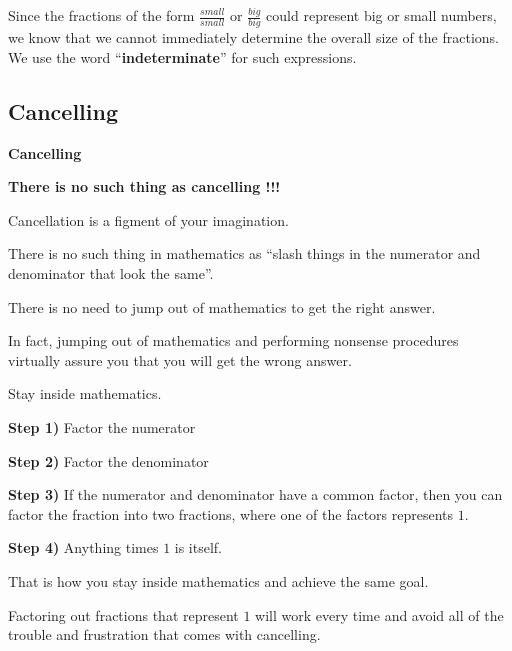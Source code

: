 \documentclass{ximera}
\begin{document}
Since the fractions of the form $\frac{small}{small}$  or  $\frac{big}{big}$ could represent big or small numbers, we know that we cannot immediately determine the overall size of the fractions.  We use the word ``\textbf{\textcolor{blue!55!black}{indeterminate}}'' for such expressions.












\newpage







\subsection*{Cancelling}


\begin{warning} \textbf{\textcolor{red!70!black}{Cancelling}}



\begin{center}
\textbf{\textcolor{red!70!black}{There is no such thing as cancelling !!!}}
\end{center}


Cancellation is a figment of your imagination.  

There is no such thing in mathematics as ``slash things in the numerator and denominator that look the same''.

There is no need to jump out of mathematics to get the right answer.

In fact, jumping out of mathematics and performing nonsense procedures virtually assure you that you will get the wrong answer.


Stay inside mathematics.



\textbf{\textcolor{blue!55!black}{Step 1)}}  Factor the numerator

\textbf{\textcolor{blue!55!black}{Step 2)}}  Factor the denominator

\textbf{\textcolor{blue!55!black}{Step 3)}} If the numerator and denominator have a common factor, then you can factor the fraction into two fractions, where one of the factors represents $1$.

\textbf{\textcolor{blue!55!black}{Step 4)}} Anything times $1$ is itself.



That is how you stay inside mathematics and achieve the same goal.

Factoring out fractions that represent $1$ will work every time and avoid all of the trouble and frustration that comes with cancelling.




\end{warning}
\end{document}
